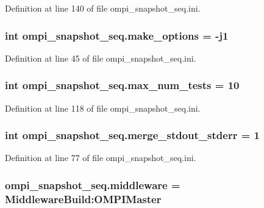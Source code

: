 Definition at line 140 of file ompi\-\_\-snapshot\-\_\-seq.\-ini.

\hypertarget{namespaceompi__snapshot__seq_a42ad6d7d01611e1404c4747596bad26f}{
\subsubsection[{make\-\_\-options}]{\setlength{\rightskip}{0pt plus 5cm}int ompi\-\_\-snapshot\-\_\-seq.\-make\-\_\-options = -\/j1}}\label{namespaceompi__snapshot__seq_a42ad6d7d01611e1404c4747596bad26f}


Definition at line 45 of file ompi\-\_\-snapshot\-\_\-seq.\-ini.

\hypertarget{namespaceompi__snapshot__seq_a8c173774cc05394e996dbb13e37d0322}{
\subsubsection[{max\-\_\-num\-\_\-tests}]{\setlength{\rightskip}{0pt plus 5cm}int ompi\-\_\-snapshot\-\_\-seq.\-max\-\_\-num\-\_\-tests = 10}}\label{namespaceompi__snapshot__seq_a8c173774cc05394e996dbb13e37d0322}


Definition at line 118 of file ompi\-\_\-snapshot\-\_\-seq.\-ini.

\hypertarget{namespaceompi__snapshot__seq_ad98d5c78e44526c2b86baccb081cd46e}{
\subsubsection[{merge\-\_\-stdout\-\_\-stderr}]{\setlength{\rightskip}{0pt plus 5cm}int ompi\-\_\-snapshot\-\_\-seq.\-merge\-\_\-stdout\-\_\-stderr = 1}}\label{namespaceompi__snapshot__seq_ad98d5c78e44526c2b86baccb081cd46e}


Definition at line 77 of file ompi\-\_\-snapshot\-\_\-seq.\-ini.

\hypertarget{namespaceompi__snapshot__seq_a25acb4b0e7bb13ac146f46ae7f074689}{
\subsubsection[{middleware}]{\setlength{\rightskip}{0pt plus 5cm}ompi\-\_\-snapshot\-\_\-seq.\-middleware = Middleware\-Build\-:\-O\-M\-P\-I\-Master}}\label{namespaceompi__snapshot__seq_a25acb4b0e7bb13ac146f46ae7f074689}


